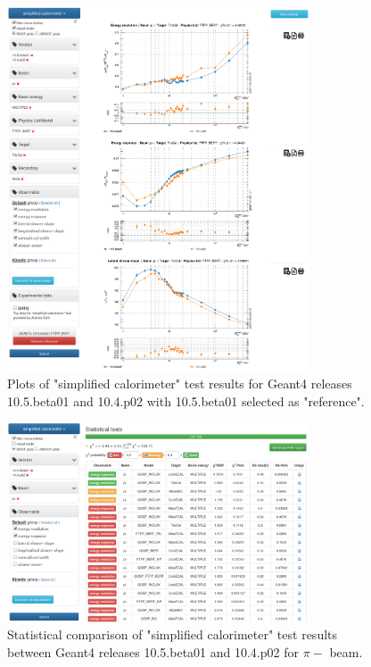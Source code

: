 \begin{itemize}
\begin{figure}[h]
    \centering
    \includegraphics[width=0.8\textwidth,clip]{sc_visual_ratio.png}
    \caption{Plots of "simplified calorimeter" test results for Geant4 releases 10.5.beta01 and 10.4.p02 with 10.5.beta01 selected as "reference".}
    \label{fig:sc_visual_ratio}
\end{figure}

\begin{figure}[h]
    \centering
    \includegraphics[width=0.8\textwidth,clip]{statcomparison.png}
    \caption{Statistical comparison of "simplified calorimeter" test results between Geant4 releases 10.5.beta01 and 10.4.p02 for $\pi-$ beam.}
    \label{fig:statcomparison}
\end{figure}




\end{itemize}
